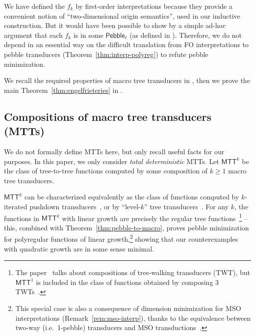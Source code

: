 \documentclass{fundam}
\newcommand{\Pebble}{\mathsf{Pebble}}
\newcommand{\MTT}{\mathsf{MTT}}
\theoremstyle{claimstyle}
\begin{document}
\begin{remark}\label{rem:fo-useless}
  We have defined the $f_k$ by first-order interpretations because they provide
  a convenient notion of \enquote{two-dimensional origin semantics}, used in our
  inductive construction. But it would have been possible to show by a simple
  ad-hoc argument that each $f_k$ is in some $\Pebble_\ell$ (as defined in
  ). Therefore, we do not depend in an essential way on the
  difficult translation from FO interpretations to pebble transducers
  (Theorem~\ref{thm:interp-polyreg}) to refute pebble minimization.
\end{remark}


 We recall the required properties of macro tree transducers in
 , then we prove the main Theorem~\ref{thm:engelfrieteries} in .

\subsection{Compositions of macro tree transducers (MTTs)}
\label{sec:comp-mtt}

We do not formally define MTTs here, but only recall useful facts for our purposes. In this paper, we only consider \emph{total deterministic} MTTs. Let $\MTT^k$ be the class of tree-to-tree functions computed by some composition of $k\geq1$ macro tree transducers.
\begin{remark}
  $\MTT^k$ can be characterized equivalently as the class of functions computed
  by \mbox{$k$-iterated} pushdown transducers~\cite{EngelfrietPushdownMacro}, or by
  \enquote{level-$k$} tree transducers~\cite{EngelfrietHighLevel}. For any $k$,
  the functions in $\MTT^k$ with linear growth are precisely the regular tree
  functions~\cite{EngelfrietIM21}\footnote{The paper~\cite{EngelfrietIM21} talks
    about compositions of tree-walking transducers (TWT), but $\MTT^1$ is
    included in the class of functions obtained by composing 3
    TWTs~\cite[Lemma~37]{EngelfrietPebbleMacro}.} -- this, combined with
  Theorem~\ref{thm:pebble-to-macro}, proves pebble minimization for
  polyregular functions of linear growth,\footnote{This special case is also a
    consequence of dimension minimization for MSO interpretations (Remark~\ref{rem:mso-interp}), thanks to the equivalence between two-way (i.e.\ 1-pebble) transducers and MSO transductions~\cite{EngelfrietHoogeboom}.} showing that our counterexamples with quadratic growth are in some sense minimal.
\end{remark}
\end{document}

